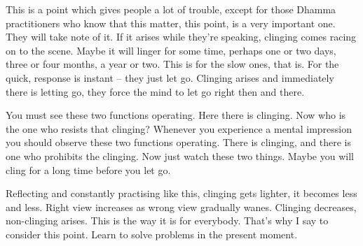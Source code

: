 This is a point which gives people a lot of trouble, except for those Dhamma practitioners who know that this matter, this point, is a very important one. They will take note of it. If it arises while they're speaking, clinging comes racing on to the scene. Maybe it will linger for some time, perhaps one or two days, three or four months, a year or two. This is for the slow ones, that is. For the quick, response is instant -- they just let go. Clinging arises and immediately there is letting go, they force the mind to let go right then and there.

You must see these two functions operating. Here there is clinging. Now who is the one who resists that clinging? Whenever you experience a mental impression you should observe these two functions operating. There is clinging, and there is one who prohibits the clinging. Now just watch these two things. Maybe you will cling for a long time before you let go.

Reflecting and constantly practising like this, clinging gets lighter, it becomes less and less. Right view increases as wrong view gradually wanes. Clinging decreases, non-clinging arises. This is the way it is for everybody. That's why I say to consider this point. Learn to solve problems in the present moment.

